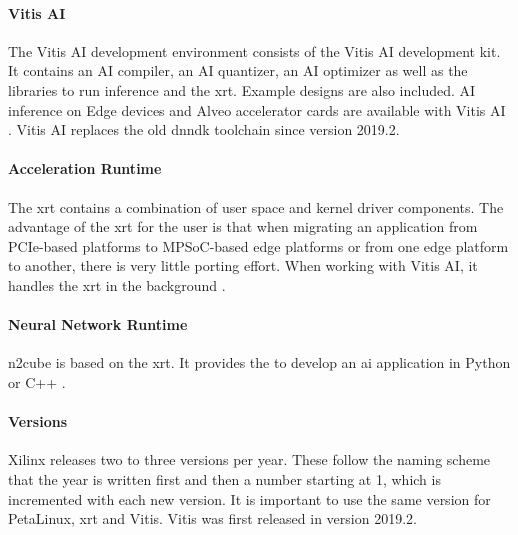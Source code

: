 \paragraph{Vitis AI}
The Vitis AI development environment consists of the Vitis AI development kit.
It contains an AI compiler, an AI quantizer, an AI optimizer as well as the libraries to run inference and the \acrfull{xrt}.
Example designs are also included.
AI inference on Edge devices and Alveo accelerator cards are available with Vitis AI \cite{vitis_ai_user_guide}.
Vitis AI replaces the old \acrshort{dnndk} toolchain since version 2019.2.

\paragraph{Acceleration Runtime}
The \acrfull{xrt} contains a combination of user space and kernel driver components.
The advantage of the \acrshort{xrt} for the user is that when migrating an application from PCIe-based platforms to MPSoC-based edge platforms or from one edge platform to another, there is very little porting effort.
When working with Vitis AI, it handles the \acrshort{xrt} in the background \cite{xrt_overview}.

\paragraph{Neural Network Runtime}
\acrshort{n2cube} is based on the \acrshort{xrt}.
It provides the  to develop an \acrshort{ai} application in Python or C++ \cite{vitis_ai_user_guide}.

\paragraph{Versions}
Xilinx releases two to three versions per year.
These follow the naming scheme that the year is written first and then a number starting at 1, which is incremented with each new version.
It is important to use the same version for PetaLinux, \acrshort{xrt} and Vitis.
Vitis was first released in version 2019.2.

